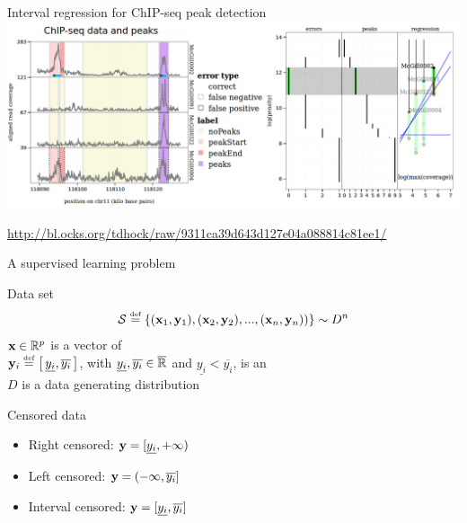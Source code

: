 \documentclass{beamer}
\newcommand{\ylower}[1]{\ensuremath{\underline{y_{#1}}}}
\newcommand{\yupper}[1]{\ensuremath{\overline{y_{#1}}}}
\begin{document}
\begin{frame}{Interval regression for ChIP-seq peak detection}
  \includegraphics[width=\textwidth]{ChIP-seq-peak-detection}

  \small
  \url{http://bl.ocks.org/tdhock/raw/9311ca39d643d127e04a088814c81ee1/}
\end{frame}

\begin{frame}{A supervised learning problem}
	\begin{block}{Data set}
		\begin{equation*}
		\mathcal{S} \overset{{\rm \mbox{\tiny def}}}{=} \{(\mathbf{x}_1, \mathbf{y}_1), (\mathbf{x}_2, \mathbf{y}_2), ..., (\mathbf{x}_n, \mathbf{y}_n))\} \sim D^n
		\end{equation*}
		$\mathbf{x} \in \mathbb{R}^p$ is a vector of \\[2mm]
		$\yb_i \eqdef \left[ \, \ylower{i}, \yupper{i} \, \right]$, with $\ylower{i}, \yupper{i} \in \overline\reals$ and $\ylower{i} < \yupper{i}$, is an \\[2mm]
		$D$ is a  data generating distribution
	\end{block}
	\pause
	\vspace{2mm}
	\begin{block}{Censored data}
		\begin{itemize}
			\item<+-> Right censored: $\yb = [\ylower{i}, +\infty)$ \vspace{2mm}
			\item<+-> Left censored: $\yb = (-\infty, \yupper{i}]$ \vspace{2mm}
			\item<+-> Interval censored: $\yb = [\ylower{i}, \yupper{i}]$
		\end{itemize}
	\end{block}
\end{frame}
\end{document}
